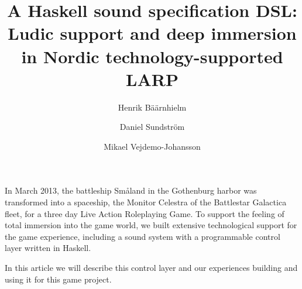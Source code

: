 \documentclass{tmr}
\title{A Haskell sound specification DSL: Ludic support and deep immersion in Nordic technology-supported LARP}
\author{Henrik Bäärnhielm\email{redstar@kth.se}}
\author{Daniel Sundström\email{daniel@monkeydancers.com}}
\author{Mikael Vejdemo-Johansson\email{mikael@johanssons.org}}
\begin{document}
\begin{introduction}
  In March 2013, the battleship Småland in the Gothenburg harbor was
  transformed into a spaceship, the Monitor Celestra of the
  Battlestar Galactica fleet, for a three day Live Action Roleplaying
  Game. To support the feeling of total immersion into the game world,
  we built extensive technological support for the game experience,
  including a sound system with a programmable control layer written
  in Haskell. 

  In this article we will describe this control layer and our
  experiences building and using it for this game project.
\end{introduction}
















%
%

\end{document}
